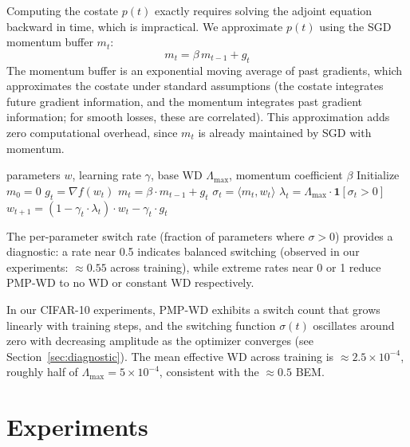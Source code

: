 \documentclass{article}
\begin{document}
Computing the costate $p(t)$ exactly requires solving the adjoint equation backward in time, which is impractical. We approximate $p(t)$ using the SGD momentum buffer $m_t$:
\begin{equation}
m_t = \beta \, m_{t-1} + g_t
\label{eq:momentum}
\end{equation}
The momentum buffer is an exponential moving average of past gradients, which approximates the costate under standard assumptions (the costate integrates future gradient information, and the momentum integrates past gradient information; for smooth losses, these are correlated). This approximation adds zero computational overhead, since $m_t$ is already maintained by SGD with momentum.

\begin{algorithm}[t]
\caption{PMP-WD}
\label{alg:pmpwd}
\begin{algorithmic}[1]
\REQUIRE parameters $w$, learning rate $\gamma$, base WD $\Lambda_{\max}$, momentum coefficient $\beta$
\STATE Initialize $m_0 = 0$
    \STATE $g_t = \nabla f(w_t)$
    \STATE $m_t = \beta \cdot m_{t-1} + g_t$
    \STATE $\sigma_t = \langle m_t, w_t \rangle$ \hfill {}
    \STATE $\lambda_t = \Lambda_{\max} \cdot \mathbf{1}[\sigma_t > 0]$ \hfill {}
    \STATE $w_{t+1} = (1 - \gamma_t \cdot \lambda_t) \cdot w_t - \gamma_t \cdot g_t$
\ENDFOR
\end{algorithmic}
\end{algorithm}

The per-parameter switch rate (fraction of parameters where $\sigma > 0$) provides a diagnostic: a rate near 0.5 indicates balanced switching (observed in our experiments: $\approx 0.55$ across training), while extreme rates near 0 or 1 reduce PMP-WD to no WD or constant WD respectively.

In our CIFAR-10 experiments, PMP-WD exhibits a switch count that grows linearly with training steps, and the switching function $\sigma(t)$ oscillates around zero with decreasing amplitude as the optimizer converges (see Section~\ref{sec:diagnostic}). The mean effective WD across training is $\approx 2.5 \times 10^{-4}$, roughly half of $\Lambda_{\max} = 5 \times 10^{-4}$, consistent with the $\approx 0.5$ BEM.

\section{Experiments}
\label{sec:experiments}
\end{document}
